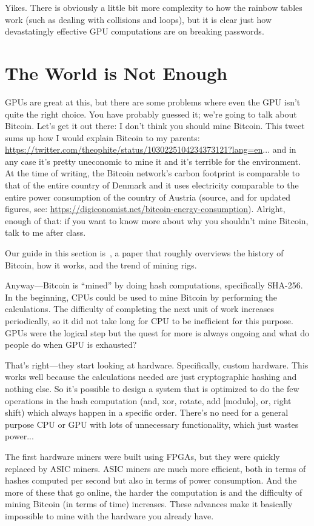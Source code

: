 Yikes. There is obviously a little bit more complexity to how the rainbow tables work (such as dealing with collisions and loops), but it is clear just how devastatingly effective GPU computations are on breaking passwords.

\section*{The World is Not Enough}
GPUs are great at this, but there are some problems where even the GPU isn't quite the right choice. You have probably guessed it; we're going to talk about Bitcoin. Let's get it out there: I don't think you should mine Bitcoin. This tweet sums up how I would explain Bitcoin to my parents: \url{https://twitter.com/theophite/status/1030225104234373121?lang=en}... and in any case it's pretty uneconomic to mine it and it's terrible for the environment. At the time of writing, the Bitcoin network's carbon footprint is comparable to that of the entire country of Denmark and it uses electricity comparable to the entire power consumption of the country of Austria (source, and for updated figures, see: \url{https://digiconomist.net/bitcoin-energy-consumption}). Alright, enough of that: if you want to know more about why you shouldn't mine Bitcoin, talk to me after class. 

Our guide in this section is~\cite{bitcoin}, a paper that roughly overviews the history of Bitcoin, how it works, and the trend of mining rigs. 

Anyway---Bitcoin is ``mined'' by doing hash computations, specifically SHA-256. In the beginning, CPUs could be used to mine Bitcoin by performing the calculations. The difficulty of completing the next unit of work increases periodically, so it did not take long for CPU to be inefficient for this purpose. GPUs were the logical step but the quest for more is always ongoing and what do people do when GPU is exhausted?

That's right---they start looking at hardware. Specifically, custom hardware. This works well because the calculations needed are just cryptographic hashing and nothing else. So it's possible to design a system that is optimized to do the few operations in the hash computation (and, xor, rotate, add [modulo], or, right shift) which always happen in a specific order. There's no need for a general purpose CPU or GPU with lots of unnecessary functionality, which just wastes power...

 The first hardware miners were built using FPGAs, but they were quickly replaced by ASIC miners. ASIC miners are much more efficient, both in terms of hashes computed per second but also in terms of power consumption. And the more of these that go online, the harder the computation is and the difficulty of mining Bitcoin (in terms of time) increases. These advances make it basically impossible to mine with the hardware you already have.

